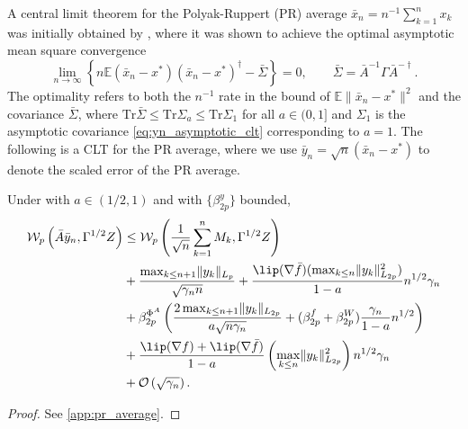 \documentclass[11pt]{article}
\begin{document}
A central limit theorem for the Polyak-Ruppert (PR) average $\bar{x}_n = n^{-1} \sum_{k=1}^n x_k$ was initially obtained by \citet{polyakJuditsky}, where it was shown to achieve the optimal asymptotic mean square convergence
\begin{equation*}
    \lim_{n \to \infty} \left\{n \mathbb{E} (\bar{x}_n - x^*) (\bar{x}_n - x^*)^\dagger - \bar{\Sigma} \right\}= 0 ,
    \qquad \bar{\Sigma} = \bar{A}^{-1} \Gamma \bar{A}^{-\dagger} . 
\end{equation*}
The optimality refers to both the $n^{-1}$ rate in the bound of $\mathbb{E}\lVert \bar{x}_n - x^* \rVert^2$ and the covariance $\bar{\Sigma}$, where $\mathrm{Tr} \bar{\Sigma} \leq \mathrm{Tr} \Sigma_a \leq \mathrm{Tr} \Sigma_1$ for all $a \in (0, 1]$ and $\Sigma_1$ is the asymptotic covariance \eqref{eq:yn_asymptotic_clt} corresponding to $a = 1$. 
The following is a \nonasymptotic CLT for the PR average, where we use $\bar{y}_n = \sqrt{n}(\bar{x}_n - x^*)$ to denote the scaled error of the PR average. 
\begin{theorem}\label{thm:pr_average}
    Under  with $a \in (1/2, 1)$ and  with $\{\beta_{2p}^y\}$ bounded,
    \begin{equation}\label{eq:pr_average_thm}
    \begin{split}
    \mathcal{W}_{p} \left( \bar{A} \bar{y}_n, \Gamma^{1/2}Z \right) 
    &\leq 
    \mathcal{W}_{p} \left(\frac{1}{\sqrt{n}} \sum_{k=1}^n M_k, \Gamma^{1/2}Z \right)
    \\ 
    &+    
    \frac{\max_{k \leq n+1} \lVert y_k \rVert_{L_p}}{\sqrt{\gamma_n n}}
    +
    \frac{\lip(\nabla \bar{f}) (\max_{k \leq n} \lVert y_k \rVert^2_{L_{2p}})}{1-a} n^{1/2} \gamma_n
    \\ 
    &
    + \beta_{2p}^{\Phi^A}
    \left(\frac{2 \max_{k \leq {n+1}} \lVert y_k \rVert_{L_{2p}} }{a \sqrt{n \gamma_n}} + (\beta_{2p}^f + \beta_{2p}^W) \frac{\gamma_n}{1-a} n^{1/2} \right)
    \\ 
    &+
    \frac{\lip(\nabla f) + \lip(\nabla \bar{f}) }{1-a} \left(\max_{k \leq n} \lVert y_k \rVert^2_{L_{2p}}\right) n^{1/2} \gamma_n
    \\ &
    + \mathcal{O}\left(\sqrt{\gamma_n}\right) .             
    \end{split}
    \end{equation}
\end{theorem}
\begin{proof}
    See \cref{app:pr_average}.
\end{proof}
\end{document}
